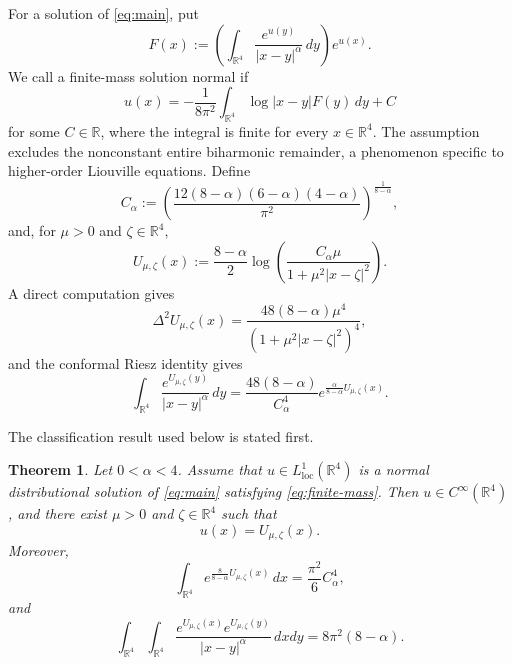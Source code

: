 \documentclass[11pt]{article}
\newtheorem{theorem}{Theorem}[section]
\numberwithin{equation}{section}
\begin{document}
For a solution of \eqref{eq:main}, put
\[
F(x):=
\left(\int_{\mathbb R^{4}}\frac{e^{u(y)}}{|x-y|^{\alpha}}\,dy\right)e^{u(x)}.
\]
We call a finite-mass solution normal if
\begin{equation}\label{eq:normality}
u(x)=-\frac{1}{8\pi^{2}}
\int_{\mathbb R^{4}}\log|x-y|F(y)\,dy+C
\end{equation}
for some \(C\in\mathbb R\), where the integral is finite for every
\(x\in\mathbb R^{4}\). The assumption excludes the nonconstant entire
biharmonic remainder, a phenomenon specific to higher-order Liouville
equations. Define
\begin{equation}\label{eq:C-alpha}
C_{\alpha}:=
\left(
\frac{12(8-\alpha)(6-\alpha)(4-\alpha)}{\pi^{2}}
\right)^{\frac{1}{8-\alpha}},
\end{equation}
and, for \(\mu>0\) and \(\zeta\in\mathbb R^{4}\),
\begin{equation*}
U_{\mu,\zeta}(x)
:=\frac{8-\alpha}{2}\log
\left(
\frac{C_{\alpha}\mu}{1+\mu^{2}|x-\zeta|^{2}}
\right).
\end{equation*}
A direct computation gives
\begin{equation*}
\Delta^{2}U_{\mu,\zeta}(x)
=
\frac{48(8-\alpha)\mu^{4}}
{\left(1+\mu^{2}|x-\zeta|^{2}\right)^{4}},
\end{equation*}
and the conformal Riesz identity gives
\begin{equation}\label{eq:Riesz-bubble}
\int_{\mathbb R^{4}}
\frac{e^{U_{\mu,\zeta}(y)}}{|x-y|^{\alpha}}\,dy
=
\frac{48(8-\alpha)}{C_{\alpha}^{4}}
e^{\frac{\alpha}{8-\alpha}U_{\mu,\zeta}(x)}.
\end{equation}

The classification result used below is stated first.

\begin{theorem}\label{thm:classification}
Let \(0<\alpha<4\). Assume that \(u\in L^{1}_{\operatorname{loc}}(\mathbb R^{4})\) is a normal distributional solution of \eqref{eq:main} satisfying \eqref{eq:finite-mass}. Then \(u\in C^{\infty}(\mathbb R^{4})\), and there exist \(\mu>0\) and \(\zeta\in\mathbb R^{4}\) such that
\[
u(x)=U_{\mu,\zeta}(x).
\]
Moreover,
\begin{equation}\label{eq:mass-identity}
\int_{\mathbb R^{4}}e^{\frac{8}{8-\alpha}U_{\mu,\zeta}(x)}\,dx
=\frac{\pi^{2}}{6}C_{\alpha}^{4},
\end{equation}
and
\begin{equation}\label{eq:double-identity}
\int_{\mathbb R^{4}}\int_{\mathbb R^{4}}
\frac{e^{U_{\mu,\zeta}(x)}e^{U_{\mu,\zeta}(y)}}{|x-y|^{\alpha}}\,dxdy
=8\pi^{2}(8-\alpha).
\end{equation}
\end{theorem}
\end{document}
